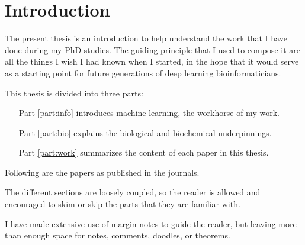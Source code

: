 \chapter{Introduction}

The present thesis is an introduction to help understand the work that I have done during my PhD studies.
The guiding principle that I used to compose it are all the things I wish I had known when I started, in the hope that it would serve as a starting point for future generations of deep learning bioinformaticians.

This thesis is divided into three parts:

\begin{itemize}
	\item[Part \ref{part:info}] introduces machine learning, the workhorse of my work.
	\item[Part \ref{part:bio}] explains the biological and biochemical underpinnings.
	\item[Part \ref{part:work}] summarizes the content of each paper in this thesis.
\end{itemize}

Following are the papers as published in the journals.

The different sections are loosely coupled, so the reader is allowed and encouraged to skim or skip the parts that they are familiar with.

I have made extensive use of margin notes to guide the reader, but leaving more than enough space for notes, comments, doodles, or theorems.

